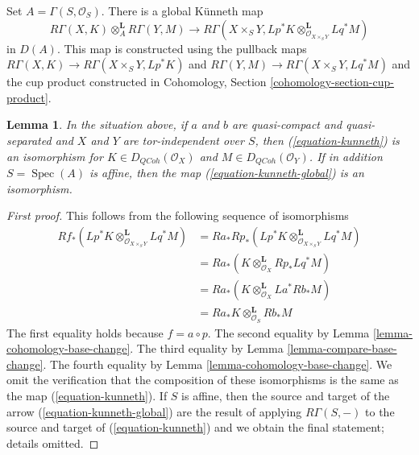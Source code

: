 \documentclass{stacks-project}
\theoremstyle{plain}
\newtheorem{lemma}[subsection]{Lemma}
\theoremstyle{definition}
\theoremstyle{remark}
\numberwithin{equation}{subsection}
\def\Spec{\mathop{\mathrm{Spec}}}
\def\QCoh{\mathit{QCoh}}
\begin{document}
\medskip\noindent
Set $A = \Gamma(S, \mathcal{O}_S)$. There is a global K\"unneth map
\begin{equation}
\label{equation-kunneth-global}
R\Gamma(X, K) \otimes_A^\mathbf{L} R\Gamma(Y, M)
\longrightarrow
R\Gamma(X \times_S Y,
Lp^*K \otimes_{\mathcal{O}_{X \times_S Y}}^\mathbf{L} Lq^*M)
\end{equation}
in $D(A)$. This map is constructed using the pullback maps
$R\Gamma(X, K) \to R\Gamma(X \times_S Y, Lp^*K)$ and
$R\Gamma(Y, M) \to R\Gamma(X \times_S Y, Lq^*M)$ and
the cup product constructed in
Cohomology, Section \ref{cohomology-section-cup-product}.

\begin{lemma}
\label{lemma-kunneth}
In the situation above, if $a$ and $b$ are quasi-compact and quasi-separated
and $X$ and $Y$ are tor-independent over $S$, then (\ref{equation-kunneth})
is an isomorphism for $K \in D_\QCoh(\mathcal{O}_X)$ and
$M \in D_\QCoh(\mathcal{O}_Y)$. If in addition $S = \Spec(A)$ is affine,
then the map (\ref{equation-kunneth-global}) is an isomorphism.
\end{lemma}

\begin{proof}[First proof]
This follows from the following sequence of isomorphisms
\begin{align*}
Rf_*(Lp^*K \otimes_{\mathcal{O}_{X \times_S Y}}^\mathbf{L} Lq^*M)
& =
Ra_*Rp_*(Lp^*K \otimes_{\mathcal{O}_{X \times_S Y}}^\mathbf{L} Lq^*M) \\
& =
Ra_*(K \otimes_{\mathcal{O}_X}^\mathbf{L} Rp_*Lq^*M) \\
& =
Ra_*(K \otimes_{\mathcal{O}_X}^\mathbf{L} La^*Rb_*M) \\
& =
Ra_*K \otimes_{\mathcal{O}_S}^\mathbf{L} Rb_*M
\end{align*}
The first equality holds because $f = a \circ p$. The second equality
by Lemma \ref{lemma-cohomology-base-change}. The third equality by
Lemma \ref{lemma-compare-base-change}.  The fourth equality by
Lemma \ref{lemma-cohomology-base-change}.
We omit the verification that the composition of these isomorphisms
is the same as the map (\ref{equation-kunneth}).
If $S$ is affine, then the source and target of the arrow
(\ref{equation-kunneth-global}) are the result of applying
$R\Gamma(S, -)$ to the source and target of (\ref{equation-kunneth})
and we obtain the final statement; details omitted.
\end{proof}
\end{document}
